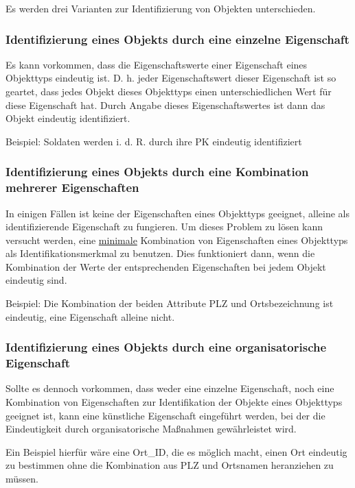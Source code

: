         Es werden drei Varianten zur Identifizierung von Objekten
        unterschieden.
        \subsubsection{Identifizierung eines Objekts durch eine einzelne
Eigenschaft}
          Es kann vorkommen, dass die Eigenschaftswerte einer Eigenschaft eines
          Objekttyps eindeutig ist. D. h. jeder Eigenschaftswert dieser
          Eigenschaft ist so geartet, dass jedes Objekt dieses Objekttyps einen
          unterschiedlichen Wert für diese Eigenschaft hat. Durch Angabe
          dieses Eigenschaftswertes ist dann das Objekt eindeutig identifiziert.

          Beispiel: Soldaten werden i. d. R. durch ihre PK eindeutig
          identifiziert

				\subsubsection{Identifizierung eines Objekts durch eine Kombination
mehrerer Eigenschaften}
          In einigen Fällen ist keine der Eigenschaften eines Objekttyps
          geeignet, alleine als identifizierende Eigenschaft zu fungieren. Um
          dieses Problem zu lösen kann versucht werden, eine
          \underline{minimale} Kombination von Eigenschaften eines Objekttyps
          als Identifikationsmerkmal zu benutzen. Dies funktioniert dann, wenn
          die Kombination der Werte der entsprechenden Eigenschaften bei jedem
          Objekt eindeutig sind.

          Beispiel: Die Kombination der beiden Attribute PLZ und Ortsbezeichnung ist eindeutig,
					eine Eigenschaft alleine nicht.

				\subsubsection{Identifizierung eines Objekts durch eine organisatorische
Eigenschaft}
          Sollte es dennoch vorkommen, dass weder eine einzelne Eigenschaft, noch eine
					Kombination von Eigenschaften zur Identifikation der Objekte eines
					Objekttyps geeignet ist, kann eine künstliche Eigenschaft
					eingeführt werden, bei der die Eindeutigkeit durch organisatorische
					Maßnahmen gewährleistet wird.

					Ein Beispiel hierfür wäre eine Ort\_ID, die es möglich
					macht, einen Ort eindeutig zu bestimmen ohne die Kombination aus PLZ
					und Ortsnamen heranziehen zu müssen.

